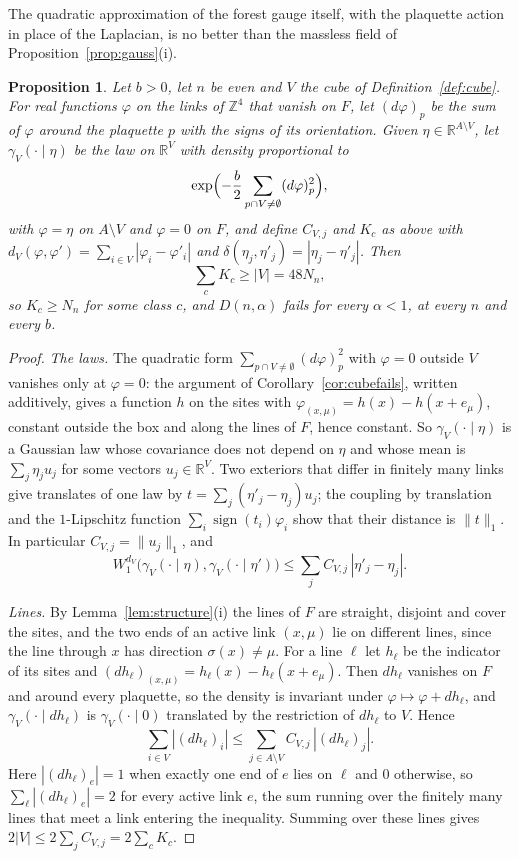 \documentclass[11pt]{amsart}
\newtheorem{proposition}[theorem]{Proposition}
\theoremstyle{definition}
\theoremstyle{remark}
\numberwithin{equation}{section}
\newcommand{\R}{\mathbb{R}}
\newcommand{\Z}{\mathbb{Z}}
\begin{document}
The quadratic approximation of the forest gauge itself, with the plaquette
action in place of the Laplacian, is no better than the massless field of
Proposition~\ref{prop:gauss}(i).

\begin{proposition}\label{prop:gaussforest}
Let $b>0$, let $n$ be even and $V$ the cube of Definition~\ref{def:cube}.
For real functions $\varphi$ on the links of $\Z^4$ that vanish on $F$, let
$(d\varphi)_p$ be the sum of $\varphi$ around the plaquette $p$ with the signs
of its orientation. Given $\eta\in\R^{A\setminus V}$, let
$\gamma_V(\cdot\mid\eta)$ be the law on $\R^V$ with density proportional to
\[
\exp\Bigl(-\frac b2\sum_{p\cap V\ne\emptyset}(d\varphi)_p^2\Bigr),
\]
with $\varphi=\eta$ on $A\setminus V$ and $\varphi=0$ on $F$, and define
$C_{V,j}$ and $K_c$ as above with $d_V(\varphi,\varphi')=\sum_{i\in V}
|\varphi_i-\varphi'_i|$ and $\delta(\eta_j,\eta'_j)=|\eta_j-\eta'_j|$. Then
\[
\sum_cK_c\ge|V|=48N_n ,
\]
so $K_c\ge N_n$ for some class $c$, and $D(n,\alpha)$ fails for every
$\alpha<1$, at every $n$ and every $b$.
\end{proposition}

\begin{proof}
\emph{The laws.} The quadratic form $\sum_{p\cap V\ne\emptyset}(d\varphi)_p^2$
with $\varphi=0$ outside $V$ vanishes only at $\varphi=0$: the argument of
Corollary~\ref{cor:cubefails}, written additively, gives a function $h$ on
the sites with $\varphi_{(x,\mu)}=h(x)-h(x+e_\mu)$, constant outside the box
and along the lines of $F$, hence constant. So $\gamma_V(\cdot\mid\eta)$ is a
Gaussian law whose covariance does not depend on $\eta$ and whose mean is
$\sum_j\eta_ju_j$ for some vectors $u_j\in\R^V$. Two exteriors that differ
in finitely many links give translates of one law by
$t=\sum_j(\eta'_j-\eta_j)u_j$; the coupling by translation and the
$1$-Lipschitz function $\sum_i\operatorname{sign}(t_i)\varphi_i$ show that
their distance is $\|t\|_1$. In particular $C_{V,j}=\|u_j\|_1$, and
\[
W_1^{d_V}\bigl(\gamma_V(\cdot\mid\eta),\gamma_V(\cdot\mid\eta')\bigr)\le
\sum_jC_{V,j}\,|\eta'_j-\eta_j| .
\]

\emph{Lines.} By Lemma~\ref{lem:structure}(i) the lines of $F$ are straight,
disjoint and cover the sites, and the two ends of an active link $(x,\mu)$
lie on different lines, since the line through $x$ has direction
$\sigma(x)\ne\mu$. For a line $\ell$ let $h_\ell$
be the indicator of its sites and $(dh_\ell)_{(x,\mu)}=h_\ell(x)-h_\ell(x+e_\mu)$.
Then $dh_\ell$ vanishes on $F$ and around every plaquette, so the density is
invariant under $\varphi\mapsto\varphi+dh_\ell$, and
$\gamma_V(\cdot\mid dh_\ell)$ is $\gamma_V(\cdot\mid0)$ translated by the
restriction of $dh_\ell$ to $V$. Hence
\[
\sum_{i\in V}|(dh_\ell)_i|\le\sum_{j\in A\setminus V}C_{V,j}\,|(dh_\ell)_j| .
\]
Here $|(dh_\ell)_e|=1$ when exactly one end of $e$ lies on $\ell$ and $0$
otherwise, so $\sum_\ell|(dh_\ell)_e|=2$ for every active link $e$, the sum
running over the finitely many lines that meet a link entering the
inequality. Summing over these lines gives $2|V|\le2\sum_jC_{V,j}=
2\sum_cK_c$.
\end{proof}
\end{document}
